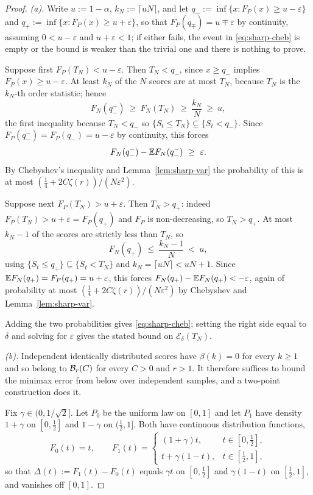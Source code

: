 \documentclass[../../../main.tex]{subfiles}
\begin{document}
\begin{proof}
\emph{(a).} Write $u:=1-\alpha$, $k_N:=\lceil uN\rceil$, and let $q_-:=\inf\{x:F_P(x)\ge u-\varepsilon\}$ and $q_+:=\inf\{x:F_P(x)\ge u+\varepsilon\}$, so that $F_P(q_\mp)=u\mp\varepsilon$ by continuity, assuming $0<u-\varepsilon$ and $u+\varepsilon<1$; if either fails, the event in \eqref{eq:sharp-cheb} is empty or the bound is weaker than the trivial one and there is nothing to prove.

Suppose first $F_P(T_N)<u-\varepsilon$. Then $T_N<q_-$, since $x\ge q_-$ implies $F_P(x)\ge u-\varepsilon$. At least $k_N$ of the $N$ scores are at most $T_N$, because $T_N$ is the $k_N$-th order statistic; hence
\[
F_N(q_-^-)\ \ge\ F_N(T_N)\ \ge\ \frac{k_N}N\ \ge\ u ,
\]
the first inequality because $T_N<q_-$ so $\{S_t\le T_N\}\subseteq\{S_t<q_-\}$. Since $F_P(q_-^-)=F_P(q_-)=u-\varepsilon$ by continuity, this forces
\[
F_N(q_-^-)-\mathbb{E} F_N(q_-^-)\ \ge\ \varepsilon .
\]
By Chebyshev's inequality and Lemma~\ref{lem:sharp-var} the probability of this is at most $(\tfrac14+2C\zeta(r))/(N\varepsilon^2)$.

Suppose next $F_P(T_N)>u+\varepsilon$. Then $T_N>q_+$: indeed $F_P(T_N)>u+\varepsilon=F_P(q_+)$ and $F_P$ is non-decreasing, so $T_N>q_+$. At most $k_N-1$ of the scores are strictly less than $T_N$, so
\[
F_N(q_+)\ \le\ \frac{k_N-1}N\ <\ u ,
\]
using $\{S_t\le q_+\}\subseteq\{S_t<T_N\}$ and $k_N=\lceil uN\rceil<uN+1$. Since $\mathbb{E} F_N(q_+)=F_P(q_+)=u+\varepsilon$, this forces $F_N(q_+)-\mathbb{E} F_N(q_+)<-\varepsilon$, again of probability at most $(\tfrac14+2C\zeta(r))/(N\varepsilon^2)$ by Chebyshev and Lemma~\ref{lem:sharp-var}.

Adding the two probabilities gives \eqref{eq:sharp-cheb}; setting the right side equal to $\delta$ and solving for $\varepsilon$ gives the stated bound on $\mathcal E_\delta(T_N)$.

\emph{(b).} Independent identically distributed scores have $\beta(k)=0$ for every $k\ge1$ and so belong to $\mathcal B_{r}(C)$ for every $C>0$ and $r>1$. It therefore suffices to bound the minimax error from below over independent samples, and a two-point construction does it.

Fix $\gamma\in(0,1/\sqrt2]$. Let $P_0$ be the uniform law on $[0,1]$ and let $P_1$ have density $1+\gamma$ on $[0,\tfrac12]$ and $1-\gamma$ on $(\tfrac12,1]$. Both have continuous distribution functions,
\[
F_0(t)=t,\qquad F_1(t)=\begin{cases}(1+\gamma)t,&t\in[0,\tfrac12],\\ t+\gamma(1-t),&t\in[\tfrac12,1],\end{cases}
\]
so that $\Delta(t):=F_1(t)-F_0(t)$ equals $\gamma t$ on $[0,\tfrac12]$ and $\gamma(1-t)$ on $[\tfrac12,1]$, and vanishes off $[0,1]$.


\end{proof}
\end{document}
